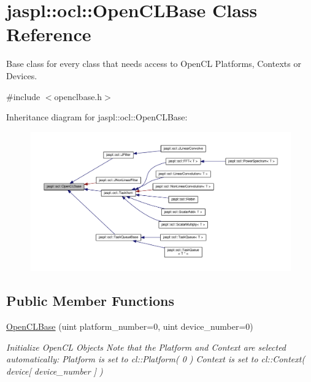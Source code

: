 \hypertarget{classjaspl_1_1ocl_1_1_open_c_l_base}{}\section{jaspl\+:\+:ocl\+:\+:Open\+C\+L\+Base Class Reference}
\label{classjaspl_1_1ocl_1_1_open_c_l_base}


Base class for every class that needs access to Open\+CL Platforms, Contexts or Devices.  




{\ttfamily \#include $<$openclbase.\+h$>$}



Inheritance diagram for jaspl\+:\+:ocl\+:\+:Open\+C\+L\+Base\+:
\nopagebreak
\begin{figure}[H]
\begin{center}
\leavevmode
\includegraphics[width=350pt]{classjaspl_1_1ocl_1_1_open_c_l_base__inherit__graph}
\end{center}
\end{figure}
\subsection*{Public Member Functions}
\begin{DoxyCompactItemize}
\item 
\hyperlink{classjaspl_1_1ocl_1_1_open_c_l_base_a60c09a482b92e3e5fcaa488fcd391dcb}{Open\+C\+L\+Base} (uint platform\+\_\+number=0, uint device\+\_\+number=0)
\begin{DoxyCompactList}\small\item\em Initialize Open\+CL Objects Note that the Platform and Context are selected automatically\+: Platform is set to cl\+::\+Platform( 0 ) Context is set to cl\+::\+Context( device\mbox{[} device\+\_\+number \mbox{]} ) \end{DoxyCompactList}\end{DoxyCompactItemize}
